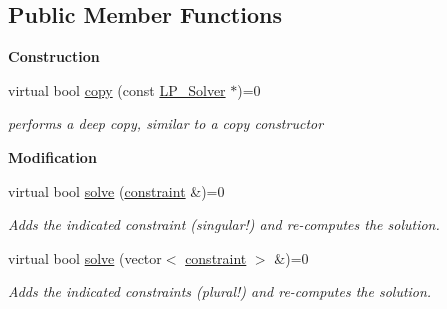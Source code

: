 \subsection*{Public Member Functions}
\begin{Indent}\textbf{ Construction}\par
\begin{DoxyCompactItemize}
\item 
virtual bool \hyperlink{class_l_p___solver_a442ad4ad67ee2feff0df49e9201d61ca}{copy} (const \hyperlink{class_l_p___solver}{L\+P\+\_\+\+Solver} $\ast$)=0
\begin{DoxyCompactList}\small\item\em performs a deep copy, similar to a copy constructor \end{DoxyCompactList}\end{DoxyCompactItemize}
\end{Indent}
\begin{Indent}\textbf{ Modification}\par
\begin{DoxyCompactItemize}
\item 
virtual bool \hyperlink{class_l_p___solver_abd84374c52124116becc8924dc74e12d}{solve} (\hyperlink{classconstraint}{constraint} \&)=0
\begin{DoxyCompactList}\small\item\em Adds the indicated constraint (singular!) and re-\/computes the solution. \end{DoxyCompactList}\item 
virtual bool \hyperlink{class_l_p___solver_a35da4bdf5db971c445f495b6eaab072d}{solve} (vector$<$ \hyperlink{classconstraint}{constraint} $>$ \&)=0
\begin{DoxyCompactList}\small\item\em Adds the indicated constraints (plural!) and re-\/computes the solution. \end{DoxyCompactList}\end{DoxyCompactItemize}
\end{Indent}
